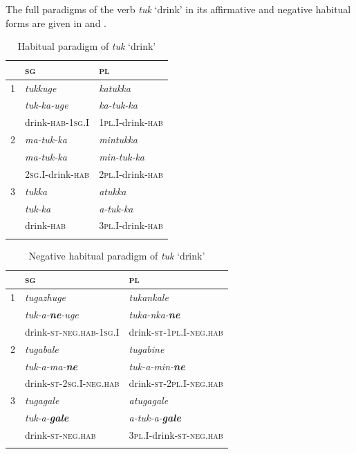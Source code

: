 \documentclass[output=paper,colorlinks,citecolor=brown]{langscibook}
\begin{document}
The full paradigms of the verb \textit{tuk} ‘drink’ in its affirmative and negative habitual forms are given in  and .

\begin{table}[t]
\begin{tabularx}{.6\textwidth}{lXX} 
    \lsptoprule
        & {\scshape sg}             & {\scshape pl}\\
    \midrule  
    {1} & {\itshape tukkuge}        & {\itshape katukka} \\
        & {\itshape tuk-ka-uge}     & {\itshape ka-tuk-ka} \\
        & drink-\textsc{hab-1sg.I}  & {\textsc{1pl.I{}-}drink-\textsc{hab}}\\
    \midrule
    {2} & {\itshape ma-tuk-ka}      & {\itshape mintukka} \\
        & {\itshape ma-tuk-ka}      & {\itshape min-tuk-ka} \\
        & {2\textsc{sg.I-}drink-\textsc{hab}} & \textsc{2pl.I-}drink-\textsc{hab}\\
    \midrule
    {3} & {\itshape tukka}          & {\itshape atukka} \\
        & {\itshape tuk-ka}         & {\itshape a-tuk-ka} \\
        & {drink-\textsc{hab}}      & {\textsc{3pl.I{}-}drink-\textsc{hab}} \\
\lspbottomrule
\end{tabularx}
\caption{Habitual paradigm of \textit{tuk} ‘drink’}
\label{tab:kog:3}
\end{table}

\begin{table}[t]
\begin{tabularx}{.8\textwidth}{lXX}
    \lsptoprule
    & {\scshape sg} & {\scshape pl}\\
    \midrule
    {1} & {\itshape tugazhuge}              & {\itshape tukankale} \\
        & \textit{tuk-a-\textbf{ne}-uge}    & \textit{tuka-nka-\textbf{ne}} \\
        & drink-\textsc{st-neg.hab-1sg.I}   & {drink-\textsc{st-1pl.I-neg.hab}} \\
    \midrule
    {2} & {\itshape tugabale}               & {\itshape tugabine} \\
        & \textit{tuk-a-ma-\textbf{ne}}     & \textit{tuk-a-min-\textbf{ne}} \\
        & drink-\textsc{st-2sg.I-neg.hab}   & drink\textsc{-st-2pl.I-neg.hab}\\
    \midrule
    {3} & \textit{tugagale}                 & \textit{atugagale} \\
        & \textit{tuk-a-\textbf{gale}}      & \textit{a-tuk-a-\textbf{gale}} \\
        & drink-\textsc{st-neg.hab}         & \textsc{3pl.I}-drink-\textsc{st-neg.hab}\\
    \lspbottomrule
\end{tabularx}
\caption{Negative habitual paradigm of \textit{tuk} ‘drink’}
\label{tab:kog:4}
\end{table} 
\end{document}
